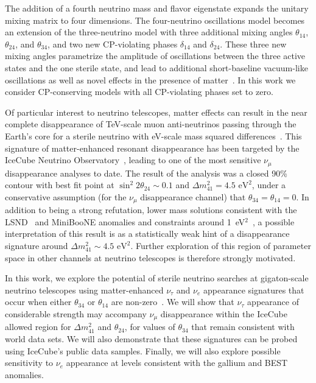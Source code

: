 \documentclass[main.tex]{subfiles}
\begin{document}
The addition of a fourth neutrino mass and flavor eigenstate expands the unitary mixing matrix to four dimensions. The four-neutrino oscillations model becomes an extension of the three-neutrino model with three additional mixing angles $\theta_{14}$, $\theta_{24}$, and $\theta_{34}$, and two new CP-violating phases $\delta_{14}$ and $\delta_{24}$. These three new mixing angles parametrize the amplitude of oscillations between the three active states and the one sterile state, and lead to additional short-baseline vacuum-like oscillations as well as novel effects in the presence of matter~\cite{Akhmedov:1988kd,KRASTEV1989341,Chizhov:1998ug, Chizhov_1999, Akhmedov_2000}.  In this work we consider CP-conserving models with all CP-violating phases set to zero.


Of particular interest to neutrino telescopes, matter effects can result in the near complete disappearance of TeV-scale muon anti-neutrinos passing through the Earth's core for a sterile neutrino with eV-scale mass squared differences~\cite{Nunokawa:2003ep, Petcov:2016iiu, Choubey:2007ji, Barger:2011rc, Esmaili:2012nz, esmaili2013restricting, Lindner:2015iaa}. This signature of matter-enhanced resonant disappearance has been targeted by the IceCube Neutrino Observatory~\cite{Aartsen_2020, Aartsen_2020_prd}, leading to one of the  most sensitive $\nu_\mu$ disappearance analyses to date. The result of the analysis was a closed 90\% contour with best fit point at $\sin^2 2\theta_{24}\sim0.1$ and $\Delta m^2_{41}=4.5\text{ eV}^2$, under a conservative assumption (for the $\nu_\mu$ disappearance channel) that $\theta_{34}=\theta_{14}=0$. In addition to being a strong refutation, lower mass solutions consistent with the LSND~\cite{Athanassopoulos_1998} and MiniBooNE anomalies and constraints around 1~eV$^2$~\cite{kopp2013sterile, Cirelli:2004cz, abazajian2012light, Gariazzo:2017fdh, Dentler:2017tkw, Diaz:2019fwt}, a possible interpretation of this result is as a statistically weak hint of a disappearance signature around $\Delta m^2_{41}\sim4.5\text{ eV}^2$.  Further exploration of this region of parameter space  in other channels at neutrino telescopes is therefore strongly motivated. 
\fi

In this work, we explore the potential of sterile neutrino searches at gigaton-scale neutrino telescopes using matter-enhanced $\nu_\tau$ and $\nu_e$  appearance signatures that occur when either $\theta_{34}$ or $\theta_{14}$ are non-zero~\cite{esmaili2013}. We will show that $\nu_\tau$ appearance of considerable strength may accompany $\nu_\mu$ disappearance within the IceCube allowed region for $\Delta m^2_{41}$ and $\theta_{24}$, for values of $\theta_{34}$ that remain consistent with world data sets.  We will also demonstrate that these signatures can be probed using IceCube's public data samples.  Finally, we will also explore possible sensitivity to $\nu_e$ appearance at levels consistent with the gallium and BEST anomalies.
\end{document}
